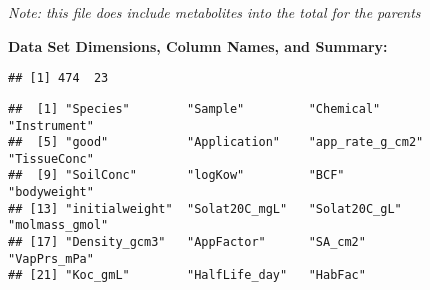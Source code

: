 \documentclass[
]{article}
\begin{document}
\emph{Note: this file does include metabolites into the total for the
parents}

\textbf{Data Set Dimensions, Column Names, and Summary:}

\begin{verbatim}
## [1] 474  23
\end{verbatim}

\begin{verbatim}
##  [1] "Species"        "Sample"         "Chemical"       "Instrument"    
##  [5] "good"           "Application"    "app_rate_g_cm2" "TissueConc"    
##  [9] "SoilConc"       "logKow"         "BCF"            "bodyweight"    
## [13] "initialweight"  "Solat20C_mgL"   "Solat20C_gL"    "molmass_gmol"  
## [17] "Density_gcm3"   "AppFactor"      "SA_cm2"         "VapPrs_mPa"    
## [21] "Koc_gmL"        "HalfLife_day"   "HabFac"
\end{verbatim}
\end{document}

